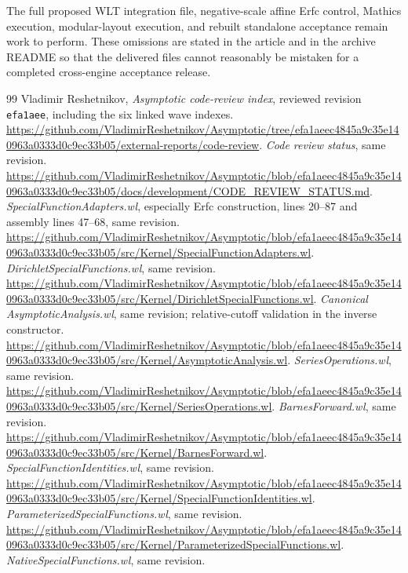 \documentclass[11pt,a4paper]{article}
\begin{document}
The full proposed WLT integration file, negative-scale affine Erfc control,
Mathics execution, modular-layout execution, and rebuilt standalone acceptance
remain work to perform. These omissions are stated in the article and in the
archive README so that the delivered files cannot reasonably be mistaken for
a completed cross-engine acceptance release.

\begin{thebibliography}{99}
\small
{} Vladimir Reshetnikov, \emph{Asymptotic code-review index},
reviewed revision \texttt{efa1aee}, including the six linked wave indexes.
\url{https://github.com/VladimirReshetnikov/Asymptotic/tree/efa1aeec4845a9c35e140963a0333d0c9ec33b05/external-reports/code-review}.
 \emph{Code review status}, same revision.
\url{https://github.com/VladimirReshetnikov/Asymptotic/blob/efa1aeec4845a9c35e140963a0333d0c9ec33b05/docs/development/CODE_REVIEW_STATUS.md}.
 \emph{SpecialFunctionAdapters.wl}, especially Erfc construction,
lines 20--87 and assembly lines 47--68, same revision.
\url{https://github.com/VladimirReshetnikov/Asymptotic/blob/efa1aeec4845a9c35e140963a0333d0c9ec33b05/src/Kernel/SpecialFunctionAdapters.wl}.
 \emph{DirichletSpecialFunctions.wl}, same revision.
\url{https://github.com/VladimirReshetnikov/Asymptotic/blob/efa1aeec4845a9c35e140963a0333d0c9ec33b05/src/Kernel/DirichletSpecialFunctions.wl}.
 \emph{Canonical AsymptoticAnalysis.wl}, same revision;
relative-cutoff validation in the inverse constructor.
\url{https://github.com/VladimirReshetnikov/Asymptotic/blob/efa1aeec4845a9c35e140963a0333d0c9ec33b05/src/Kernel/AsymptoticAnalysis.wl}.
 \emph{SeriesOperations.wl}, same revision.
\url{https://github.com/VladimirReshetnikov/Asymptotic/blob/efa1aeec4845a9c35e140963a0333d0c9ec33b05/src/Kernel/SeriesOperations.wl}.
 \emph{BarnesForward.wl}, same revision.
\url{https://github.com/VladimirReshetnikov/Asymptotic/blob/efa1aeec4845a9c35e140963a0333d0c9ec33b05/src/Kernel/BarnesForward.wl}.
 \emph{SpecialFunctionIdentities.wl}, same revision.
\url{https://github.com/VladimirReshetnikov/Asymptotic/blob/efa1aeec4845a9c35e140963a0333d0c9ec33b05/src/Kernel/SpecialFunctionIdentities.wl}.
 \emph{ParameterizedSpecialFunctions.wl}, same revision.
\url{https://github.com/VladimirReshetnikov/Asymptotic/blob/efa1aeec4845a9c35e140963a0333d0c9ec33b05/src/Kernel/ParameterizedSpecialFunctions.wl}.
 \emph{NativeSpecialFunctions.wl}, same revision.

\end{thebibliography}
\end{document}
